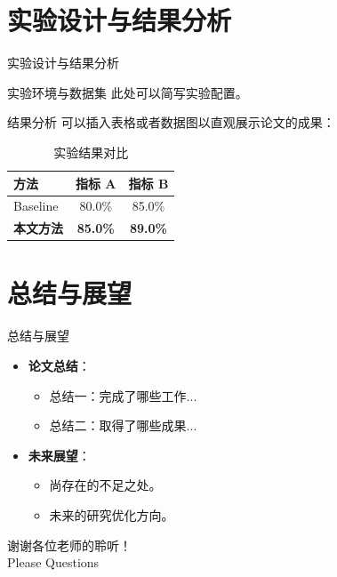\documentclass[UTF8]{ctexbeamer}
\begin{document}
\section{实验设计与结果分析}
\begin{frame}{实验设计与结果分析}
    \begin{block}{实验环境与数据集}
        此处可以简写实验配置。
    \end{block}
    
    \begin{block}{结果分析}
        可以插入表格或者数据图以直观展示论文的成果：
        \begin{table}
            \centering
            \begin{tabular}{lcc}
                \toprule
                方法 & 指标 A & 指标 B \\
                \midrule
                Baseline & 80.0\% & 85.0\% \\
                \textbf{本文方法} & \textbf{85.0\%} & \textbf{89.0\%} \\
                \bottomrule
            \end{tabular}
            \caption{实验结果对比}
        \end{table}
    \end{block}
\end{frame}

\section{总结与展望}
\begin{frame}{总结与展望}
    \begin{itemize}
        \item \textbf{论文总结}：
        \begin{itemize}
            \item 总结一：完成了哪些工作...
            \item 总结二：取得了哪些成果...
        \end{itemize}
        \vspace{0.5cm}
        \item \textbf{未来展望}：
        \begin{itemize}
            \item 尚存在的不足之处。
            \item 未来的研究优化方向。
        \end{itemize}
    \end{itemize}
\end{frame}

\begin{frame}
    \centering
    \Huge
    谢谢各位老师的聆听！\\
    \vspace{1cm}
    \Large Please Questions
\end{frame}
\end{document}
